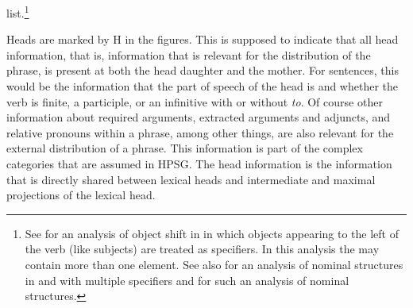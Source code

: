 \documentclass[output=paper
  ,nobabel
  ,draftmode
  ,uniformtopskip %
  ,colorlinks, citecolor=brown
]{langscibook}
\begin{document}
list.\footnote{%
  See \citet{MOe2013b} for an analysis of object shift in  in which objects appearing to the
  left of the verb (like subjects) are treated as specifiers. In this analysis the \sprl may contain
  more than one element. See also  for an analysis of nominal
structures in  and  with multiple specifiers and  for such an
analysis of  nominal structures.
}

\largerpage[2]
Heads are marked by H in the figures. This is supposed to indicate that all head information, that
is, information that is relevant for the distribution of the phrase, is present at both the head
daughter and the mother. For sentences, this would be the information that the part of speech of the
head is  and whether the verb is finite, a participle, or an infinitive with or without
\emph{to}. Of course other information 
about required arguments, extracted arguments and adjuncts, and relative
pronouns within a phrase, among other things, are also relevant for the external distribution of a phrase. This information is part
of the complex categories that are assumed in HPSG. The head information is the information
that is directly shared between lexical heads and intermediate and maximal projections of the lexical head.
\end{document}
